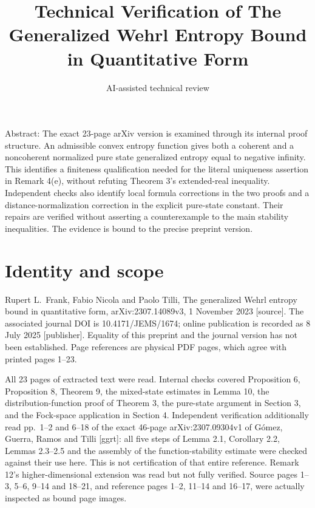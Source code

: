 \documentclass[10pt]{article}
\title{Technical Verification of
The Generalized Wehrl Entropy Bound in Quantitative Form}
\author{AI-assisted technical review}
\date{}
\begin{document}
\maketitle
Abstract: The exact 23-page arXiv version is examined through its internal proof structure. An admissible convex entropy function gives both a coherent and a noncoherent normalized pure state generalized entropy equal to negative infinity. This identifies a finiteness qualification needed for the literal uniqueness assertion in Remark 4(e), without refuting Theorem 3’s extended-real inequality. Independent checks also identify local formula corrections in the two proofs and a distance-normalization correction in the explicit pure-state constant. Their repairs are verified without asserting a counterexample to the main stability inequalities. The evidence is bound to the precise preprint version.\par
\section*{Identity and scope}
Rupert L. Frank, Fabio Nicola and Paolo Tilli, The generalized Wehrl entropy bound in quantitative form, arXiv:2307.14089v3, 1 November 2023 [source]. The associated journal DOI is 10.4171/JEMS/1674; online publication is recorded as 8 July 2025 [publisher]. Equality of this preprint and the journal version has not been established. Page references are physical PDF pages, which agree with printed pages 1–23.\par
All 23 pages of extracted text were read. Internal checks covered Proposition 6, Proposition 8, Theorem 9, the mixed-state estimates in Lemma 10, the distribution-function proof of Theorem 3, the pure-state argument in Section 3, and the Fock-space application in Section 4. Independent verification additionally read pp. 1–2 and 6–18 of the exact 46-page arXiv:2307.09304v1 of Gómez, Guerra, Ramos and Tilli [ggrt]: all five steps of Lemma 2.1, Corollary 2.2, Lemmas 2.3–2.5 and the assembly of the function-stability estimate were checked against their use here. This is not certification of that entire reference. Remark 12’s higher-dimensional extension was read but not fully verified. Source pages 1–3, 5–6, 9–14 and 18–21, and reference pages 1–2, 11–14 and 16–17, were actually inspected as bound page images.\par
\end{document}
